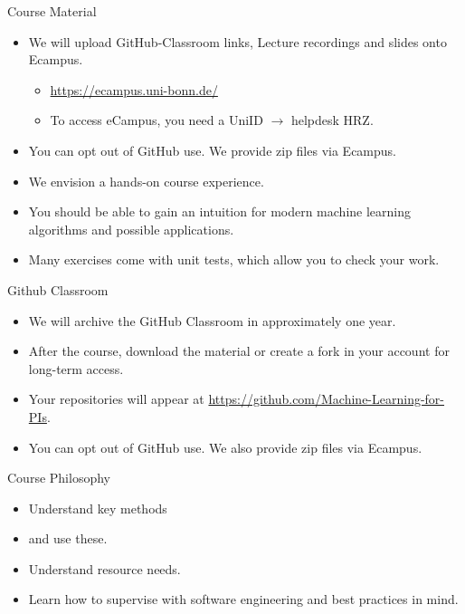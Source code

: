 \documentclass{beamer}
\begin{document}
    \begin{frame}{Course Material}
      \begin{itemize}
        \item  We will upload GitHub-Classroom links, 
               Lecture recordings and slides onto Ecampus.
        \begin{itemize}
          \item \url{https://ecampus.uni-bonn.de/}
          \item To access eCampus, you need a UniID $\rightarrow$ helpdesk HRZ.
        \end{itemize}
        \item You can opt out of GitHub use. We provide zip files via Ecampus.
        \item We envision a hands-on course experience.
        \item You should be able to gain an intuition
              for modern machine learning algorithms and possible applications.
        \item Many exercises come with unit tests, which allow you to check your work.
      \end{itemize}
    \end{frame}

    \begin{frame}{Github Classroom}
      \begin{itemize}
        \item We will archive the GitHub Classroom in approximately one year.
        \item After the course, download the material or create a fork in your account for long-term access.
        \item Your repositories will appear at \url{https://github.com/Machine-Learning-for-PIs}.
        \item You can opt out of GitHub use. We also provide zip files via Ecampus.
      \end{itemize}
       

    \end{frame}

    \begin{frame}{Course Philosophy}
      \begin{itemize}
        \item Understand key methods 
        \item and use these.
        \item Understand resource needs.
        \item Learn how to supervise with software engineering and best practices in mind. 
      \end{itemize}
    \end{frame}
\end{document}
